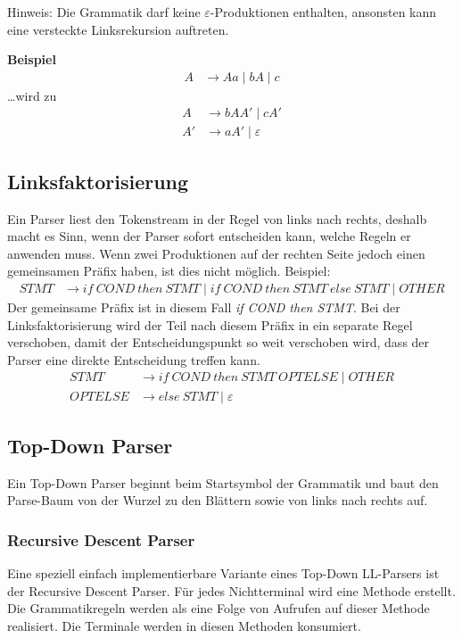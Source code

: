 Hinweis: Die Grammatik darf keine $\varepsilon$-Produktionen enthalten, ansonsten kann eine
versteckte Linksrekursion auftreten.

\textbf{Beispiel}
%
\begin{align*}
	A &\rightarrow Aa \mid bA \mid c
\end{align*}
%
\ldots{wird} zu
%
\begin{align*}
	A  &\rightarrow bAA' \mid cA' \\
	A' &\rightarrow aA' \mid \varepsilon 
\end{align*}


\subsection{Linksfaktorisierung}

Ein Parser liest den Tokenstream in der Regel von links nach rechts, deshalb
macht es Sinn, wenn der Parser sofort entscheiden kann, welche Regeln er
anwenden muss.  Wenn zwei Produktionen auf der rechten Seite jedoch einen
gemeinsamen Präfix haben, ist dies nicht möglich. Beispiel:
%
\begin{align*}
	STMT &\rightarrow if~COND~then~STMT \mid if~COND~then~STMT~else~STMT \mid OTHER
\end{align*}
%
Der gemeinsame Präfix ist in diesem Fall \textit{if COND then STMT}. Bei der
Linksfaktorisierung wird der Teil nach diesem Präfix in ein separate Regel
verschoben, damit der Entscheidungspunkt so weit verschoben wird, dass der
Parser eine direkte Entscheidung treffen kann.
%
\begin{align*}
	STMT &\rightarrow if~COND~then~STMT~OPTELSE \mid OTHER \\
	OPTELSE &\rightarrow else~STMT \mid \varepsilon
\end{align*}
%


\subsection{Top-Down Parser} 

Ein Top-Down Parser beginnt beim Startsymbol der Grammatik und baut den
Parse-Baum von der Wurzel zu den Blättern sowie von links nach rechts auf.

\subsubsection{Recursive Descent Parser}

Eine speziell einfach implementierbare Variante eines Top-Down LL-Parsers ist
der Recursive Descent Parser. Für jedes Nichtterminal wird eine Methode
erstellt. Die Grammatikregeln werden als eine Folge von Aufrufen auf dieser
Methode realisiert. Die Terminale werden in diesen Methoden konsumiert.

